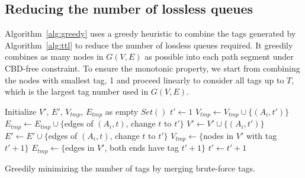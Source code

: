 \subsection{Reducing the number of lossless queues}

Algorithm~\ref{alg:greedy} uses a greedy heuristic to combine the tags generated
by Algorithm~\ref{alg:ttl} to reduce the number of lossless queues required.  It
greedily combines as many nodes in $G(V,E)$ as possible into each path segment
under CBD-free constraint. To ensure the monotonic property, we start
from combining the nodes with smallest tag, 1 and proceed linearly to consider
all tags up to $T$, which is the largest tag number used in $G(V,E)$.

\begin{algorithm}[t]
	\small
	Initialize $V'$, $E'$, $V_{tmp}$, $E_{tmp}$ as empty $Set()$\;
	$t' \gets 1$\;
	 {
		 {
			$V_{tmp} \gets V_{tmp} \cup \{(A_i, t')\}$\;
			$E_{tmp} \gets E_{tmp} \cup \{$edges of $(A_i, t)$, change $t$ to $t'\}$\;
			 {
				$V' \gets V' \cup \{(A_i, t')\}$\;
				$E' \gets E' \cup \{$edges of $(A_i, t)$, change $t$ to $t'\}$\;
			}
		}
		 {
			$V_{tmp} \gets \{$nodes in $V'$ with tag $t'+1\}$\;
			$E_{tmp} \gets \{$edges in $V'$, both ends have tag $t'+1\}$\;
			$t' \gets t'+1$\;
		}
	}
	\;
    \caption{Greedily minimizing the number of tags by merging brute-force tags.}
	\label{alg:greedy}
\end{algorithm}


